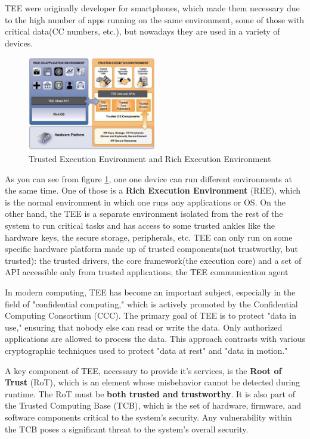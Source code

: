 TEE were originally developer for smartphones, which made them
necessary due to the high number of apps running on the same
environment, some of those with critical data(CC numbers, etc.), but
nowadays they are used in a variety of devices.

\begin{figure}[h]
  \centering
  \includegraphics[width=0.5\textwidth]{img/Tee and REE.png}
  \caption{Trusted Execution Environment and Rich Execution
  Environment}
  \label{fig:tee and ree}
\end{figure}

As you can see from figure \ref{fig:tee and ree}, one one device can
run different environments at the same time. One of those is a
\textbf{Rich Execution Environment} (REE), which is the normal
environment in which one runs any applications or OS. On the other
hand, the TEE is a separate environment isolated from the rest of the
system to run critical tasks and has access to some trusted ankles
like the hardware keys, the secure storage, peripherals, etc.
TEE can only run on some specific hardware platform made up of trusted
components(not trustworthy, but trusted): the trusted drivers, the
core framework(the execution core) and a set of API accessible only
from trusted applications, the TEE communication agent 

In modern computing, TEE has become an important subject, especially
in the field of "confidential computing," which is actively promoted
by the Confidential Computing Consortium (CCC). The primary goal of
TEE is to protect "data in use," ensuring that nobody else can read or
write the data. Only authorized applications are allowed to process
the data. This approach contrasts with various cryptographic
techniques used to protect "data at rest" and "data in motion."

A key component of TEE, necessary to provide it's services, is the
\textbf{Root of Trust} (RoT), which is an element whose misbehavior
cannot be detected during runtime. The RoT must be \textbf{both
trusted and trustworthy}. It is also part of the Trusted Computing
Base (TCB), which is the set of hardware, firmware, and software
components critical to the system's security. Any vulnerability within
the TCB poses a significant threat to the system’s overall security.

